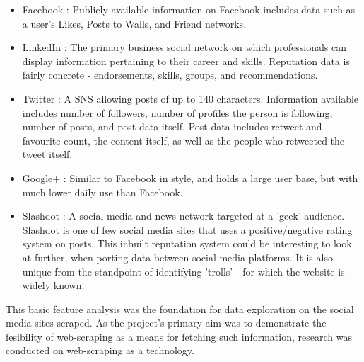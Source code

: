 






\begin{itemize}

\item Facebook \cite{facebook_site}: Publicly available information on Facebook includes data such as a user's Likes, Posts to Walls, and Friend networks. 
\item LinkedIn \cite{linkedin_site}: The primary business social network on which professionals can display information pertaining to their career and skills. Reputation data is fairly concrete - endorsements, skills, groups, and recommendations. 
\item Twitter \cite{twitter_site}: A SNS allowing posts of up to 140 characters. Information available includes number of followers, number of profiles the person is following, number of posts, and post data itself. Post data includes retweet and favourite count, the content itself, as well as the people who retweeted the tweet itself. 
\item Google+ \cite{google_site}: Similar to Facebook in style, and holds a large user base, but with much lower daily use than Facebook.
\item Slashdot \cite{slashdot_site}: A social media and news network targeted at a 'geek' audience. Slashdot is one of few social media sites that uses a positive/negative rating system on posts. This inbuilt reputation system could be interesting to look at further, when porting data between social media platforms. It is also unique from the standpoint of identifying 'trolls' - for which the website is widely known. 
\end{itemize}

This basic feature analysis was the foundation for data exploration on the social media sites scraped. As the project's primary aim was to demonstrate the fesibility of web-scraping as a means for fetching such information, research was conducted on web-scraping as a technology. 


